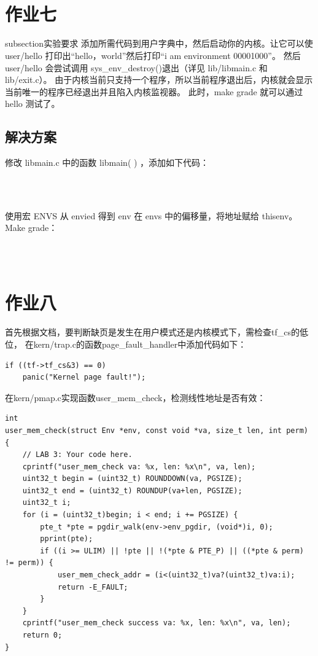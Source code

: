 \documentclass[12pt,a4paper,UTF8]{article}
\begin{document}
    \begin{lstlisting}[style=CPP]

        
    \end{lstlisting}

\section{作业七}
    subsection{实验要求} 
    添加所需代码到用户字典中，然后启动你的内核。让它可以使 user/hello 打印出“hello，world”然后打印“i am environment 00001000”。
    然后 user/hello 会尝试调用 sys\_env\_destroy()退出（详见 lib/libmain.c 和 lib/exit.c）。
    由于内核当前只支持一个程序，所以当前程序退出后，内核就会显示当前唯一的程序已经退出并且陷入内核监视器。
    此时，make grade 就可以通过 hello 测试了。 

\subsection{解决方案}  
修改 libmain.c 中的函数 libmain( ) ，添加如下代码：
    \begin{lstlisting}[style=CPP]

        
    \end{lstlisting}

    使用宏 ENVS 从 envied 得到 env 在 envs 中的偏移量，将地址赋给 thisenv。
    Make grade：
    \begin{lstlisting}[style=CPP]

        
    \end{lstlisting}
\section{作业八}
        首先根据文档，要判断缺页是发生在用户模式还是内核模式下，需检查tf\_cs的低位，
        在kern/trap.c的函数page\_fault\_handler中添加代码如下：

    \begin{lstlisting}[style=CPP]
if ((tf->tf_cs&3) == 0)
    panic("Kernel page fault!");
    \end{lstlisting}

    在kern/pmap.c实现函数user\_mem\_check，检测线性地址是否有效：

    \begin{lstlisting}[style=CPP]
int
user_mem_check(struct Env *env, const void *va, size_t len, int perm)
{
    // LAB 3: Your code here.
    cprintf("user_mem_check va: %x, len: %x\n", va, len);
    uint32_t begin = (uint32_t) ROUNDDOWN(va, PGSIZE); 
    uint32_t end = (uint32_t) ROUNDUP(va+len, PGSIZE);
    uint32_t i;
    for (i = (uint32_t)begin; i < end; i += PGSIZE) {
        pte_t *pte = pgdir_walk(env->env_pgdir, (void*)i, 0);
        pprint(pte);
        if ((i >= ULIM) || !pte || !(*pte & PTE_P) || ((*pte & perm) != perm)) {
            user_mem_check_addr = (i<(uint32_t)va?(uint32_t)va:i);
            return -E_FAULT;
        }
    }
    cprintf("user_mem_check success va: %x, len: %x\n", va, len);
    return 0;
}
    \end{lstlisting}
\end{document}
